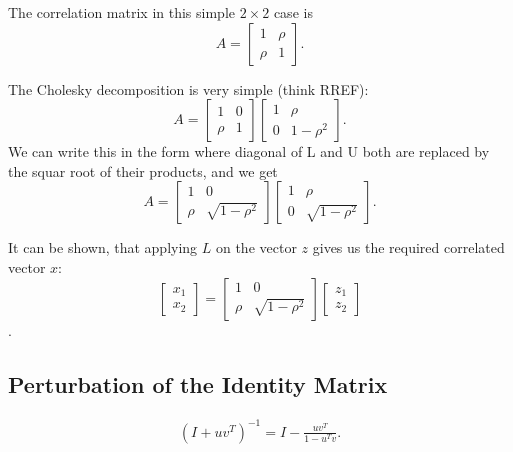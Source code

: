 \documentclass{amsart}
\theoremstyle{plain}
\numberwithin{equation}{section}
\begin{document}
The correlation matrix in this simple $2 \times 2$ case is
\begin{equation}
A = \left[
\begin{array}{cc}
	1    & \rho\\
	\rho & 1
\end{array}
\right].
\label{}
\end{equation}

The Cholesky decomposition is very simple (think RREF):
\begin{equation}
A = \left[
\begin{array}{cc}
	1    & 0\\
	\rho & 1
\end{array}
\right]
\left[
\begin{array}{cc}
	1  & \rho\\
	0  & 1 - \rho^2
\end{array}
\right].
\label{}
\end{equation}
We can write this in the form where 
diagonal of L and U both are 
replaced by the squar root of their
products, and we get
\begin{equation}
A = \left[
\begin{array}{cc}
	1    & 0\\
	\rho & \sqrt{1-\rho^2}
\end{array}
\right]
\left[
\begin{array}{cc}
	1  & \rho\\
	0  & \sqrt{1 - \rho^2}
\end{array}
\right].
\label{}
\end{equation}

It can be shown, that applying $L$ on the vector $z$
gives us the required correlated vector $x$:
\begin{equation}
\left[
\begin{array}{c}
	  x_1 \\
		x_2 
\end{array}
\right] 
= \left[
\begin{array}{cc}
	1    & 0\\
	\rho & \sqrt{1-\rho^2}
\end{array}
\right]
\left[
\begin{array}{c}
	  z_1 \\
		z_2 
\end{array}
\right]
\label{}
\end{equation}.
\subsection*{Perturbation of the Identity Matrix}
\begin{align*}
\left(I + uv^T\right)^{-1} = I - \frac{uv^T}{1 - u^Tv}.
\end{align*}
\end{document}

